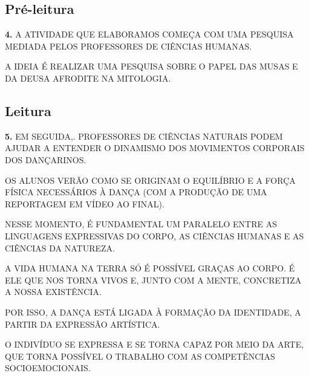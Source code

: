 \documentclass{extarticle}
\begin{document}


\subsection{Pré-leitura}

\textbf{4.} A ATIVIDADE QUE ELABORAMOS COMEÇA COM UMA PESQUISA MEDIADA
PELOS PROFESSORES DE CIÊNCIAS HUMANAS.
 
A IDEIA É REALIZAR UMA PESQUISA SOBRE O PAPEL DAS MUSAS E DA DEUSA
AFRODITE NA MITOLOGIA.
 
\subsection{Leitura}

\textbf{5.} EM SEGUIDA,. PROFESSORES DE CIÊNCIAS NATURAIS PODEM AJUDAR A
ENTENDER O DINAMISMO DOS MOVIMENTOS CORPORAIS DOS DANÇARINOS.
 
OS ALUNOS VERÃO COMO SE ORIGINAM O EQUILÍBRIO E A FORÇA FÍSICA
NECESSÁRIOS À DANÇA (COM A PRODUÇÃO DE UMA REPORTAGEM EM VÍDEO AO
FINAL).
 
NESSE MOMENTO, É FUNDAMENTAL UM PARALELO ENTRE AS LINGUAGENS EXPRESSIVAS
DO CORPO, AS CIÊNCIAS HUMANAS E AS CIÊNCIAS DA NATUREZA.
 
A VIDA HUMANA NA TERRA SÓ É POSSÍVEL GRAÇAS AO CORPO. É ELE QUE NOS
TORNA VIVOS E, JUNTO COM A MENTE, CONCRETIZA A NOSSA EXISTÊNCIA.~
 
POR ISSO, A DANÇA ESTÁ LIGADA À FORMAÇÃO DA IDENTIDADE, A PARTIR DA
EXPRESSÃO ARTÍSTICA.~
 
O INDIVÍDUO SE EXPRESSA E SE TORNA CAPAZ POR MEIO DA ARTE, QUE TORNA
POSSÍVEL O TRABALHO COM AS COMPETÊNCIAS SOCIOEMOCIONAIS.
\end{document}

